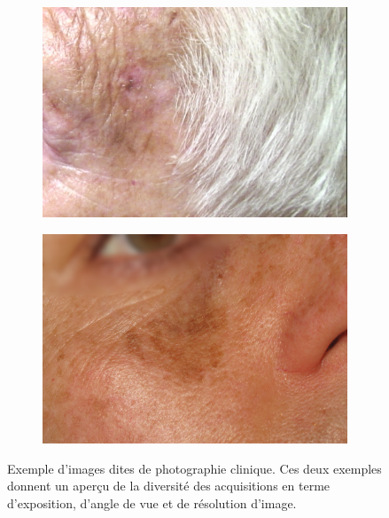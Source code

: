 \begin{figure}[H]
\centering
    \begin{subfigure}{.45\textwidth}
      \centering
      \includegraphics[width=\linewidth]{contents/chapter_2/resources/example_photography_1.png}
    \end{subfigure}
    \begin{subfigure}{.45\textwidth}
      \centering
      \includegraphics[width=\linewidth]{contents/chapter_2/resources/example_photography_2.png}
    \end{subfigure}
    \caption{Exemple d'images dites de photographie clinique. Ces deux exemples donnent un aperçu de la diversité des acquisitions en terme d'exposition, d'angle de vue et de résolution d'image.}
    \label{fig:example_photography}
\end{figure}\par

